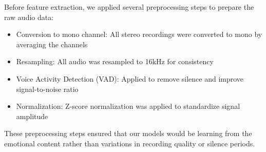 Before feature extraction, we applied several preprocessing steps to prepare the raw audio data:

\begin{itemize}
    \item Conversion to mono channel: All stereo recordings were converted to mono by averaging the channels
    \item Resampling: All audio was resampled to 16kHz for consistency
    \item Voice Activity Detection (VAD): Applied to remove silence and improve signal-to-noise ratio
    \item Normalization: Z-score normalization was applied to standardize signal amplitude
\end{itemize}

These preprocessing steps ensured that our models would be learning from the emotional content rather than variations in recording quality or silence periods. 